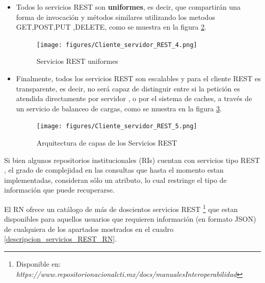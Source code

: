 \begin{itemize}
    \begin{figure}[!ht]
    	\centering
    	\texttt{[image: figures/Cliente\_servidor\_REST\_3.png]} %
        \caption{Servicios REST apoyados en cache} %
        \label{arquitectura_REST_3}
    \end{figure}
    
    \item Todos lo servicios REST son \textbf{uniformes}, es decir, que compartir\'an una forma de invocaci\'on y m\'etodos similares utilizando los metodos GET,POST,PUT ,DELETE, como se muestra en la figura \ref{arquitectura_REST_4}.
    
    \begin{figure}[!ht]
    	\centering
    	\texttt{[image: figures/Cliente\_servidor\_REST\_4.png]} %
        \caption{Servicios REST uniformes} %
        \label{arquitectura_REST_4}
    \end{figure}
    
    \item Finalmente, todos los servicios REST son escalables y para el cliente REST es transparente, es decir, no ser\'a capaz de distinguir entre si la petici\'on es atendida directamente por servidor , o por el sistema de caches, a trav\'es de un servicio de balanceo de cargas, como se muestra en la figura \ref{arquitectura_REST_5}.
    
    \begin{figure}[!ht]
    	\centering
    	\texttt{[image: figures/Cliente\_servidor\_REST\_5.png]} %
        \caption{Arquitectura de capas de los Servicios REST} %
        \label{arquitectura_REST_5}
    \end{figure}
    
\end{itemize}

Si bien algunos repositorios institucionales (RIs) cuentan con servicios tipo REST , el grado de complejidad en las consultas que hasta el momento estan implementadas, consideran s\'olo un atributo, lo cual restringe el tipo de informaci\'on que puede recuperarse.\newline

El RN ofrece un cat\'alogo de m\'as de doscientos servicios REST \footnote{Disponible en: \textit{https://www.repositorionacionalcti.mx/docs/manualesInteroperabilidad}} que estan disponibles para aquellos usuarios que requieren informaci\'on (en formato JSON) \cite{CatalogoREST_RN} de cualquiera de los apartados mostrados en el cuadro \ref{descripcion_servicios_REST_RN}.

